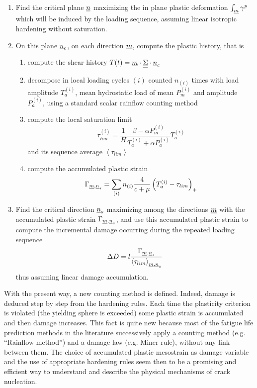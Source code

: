 \begin{enumerate}
\item Find the critical plane $\uline{n}$ maximizing the in plane plastic deformation $\int_{\uline{m}}\gamma^p$ which will be induced by the loading sequence, assuming linear isotropic hardening without saturation.
\item On this plane  $\uline{n}_c$, on each direction $\uline{m}$, compute the plastic history, that is
\begin{enumerate}
	\item compute the shear history $T(t)=\uline{m}\cdot \uline{\uline{\Sigma}}\cdot \uline{n}_c$
	\item decompose in local loading cycles $(i)$ counted $n_{(i)}$ times with load amplitude $T_a^{(i)}$, mean hydrostatic load of mean $P_m^{(i)}$ and amplitude $P_a^{(i)}$, using a standard scalar rainflow counting method
	\item compute the local saturation limit $$\tau_{lim}^{(i)}=\frac{1}{H}\frac{\beta-\alpha P_m^{(i)}}{T_a^{(i)}+\alpha P_a^{(i)}}T_a^{(i)}$$ and its sequence average $\left\langle \tau_{lim} \right\rangle$ 
	\item compute the accumulated plastic strain 
	\begin{equation}
\Gamma_{\uline{m},\uline{n}_s}=\sum_{(i)}n_{(i)}\dfrac{4}{c+\mu}\left(T_a^{(i)}-\tau_{lim} \right)_+
\label{eq.morel_plastic}
	\end{equation}
\end{enumerate}
\item Find the critical direction $\uline{n}_s$ maximizing among the directions $\uline{m}$ with the accumulated plastic strain $\Gamma_{\uline{m},\uline{n}_s}$, and use this accumulated plastic strain to compute the incremental damage occurring during the repeated loading sequence
\begin{equation}\Delta D=l\dfrac{\Gamma_{\uline{m},\uline{n}_s}}{\left\langle \tau_{lim} \right\rangle_{\uline{m},\uline{n}_s}}
	\label{NFsimple}
\end{equation}
thus assuming linear damage accumulation.
\end{enumerate}

With the present way, a new counting method is defined. Indeed, damage is deduced step by step from
the hardening rules. Each time the plasticity criterion is
violated (the yielding sphere is exceeded) some plastic
strain is accumulated and then damage increases. This
fact is quite new because most of the fatigue life prediction methods in the literature successively apply a counting method (e.g. ``Rainflow method'') and a damage law
(e.g. Miner rule), without any link between them. The
choice of accumulated plastic mesostrain as damage
variable and the use of appropriate hardening rules seem
then to be a promising and efficient way to understand
and describe the physical mechanisms of crack
nucleation.

